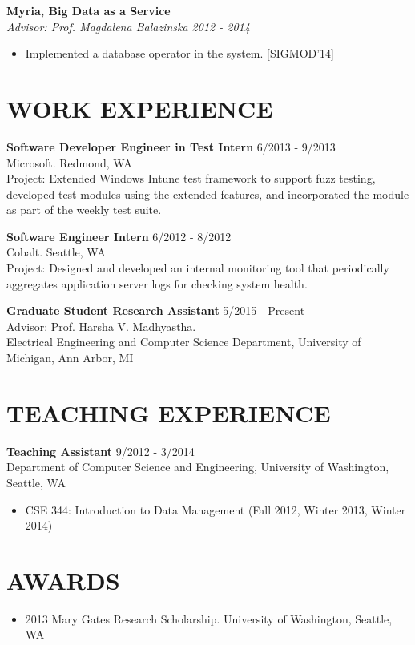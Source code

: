 \documentclass[zhemargin]{res}
\begin{document}
\begin{resume}
	\textbf{Myria, Big Data as a Service}\\
    \textit{Advisor: Prof. Magdalena Balazinska \hfill 2012 - 2014}
	\begin{itemize}
    \item Implemented a database operator in the system. [SIGMOD'14]
	\end{itemize}

\section{\small WORK EXPERIENCE}
    \textbf{Software Developer Engineer in Test Intern} \hfill 6/2013 - 9/2013 \\
    Microsoft. Redmond, WA\\
    Project: Extended Windows Intune test framework to support fuzz testing, developed test modules using the extended features, and incorporated the module as part of the weekly test suite.

    \textbf{Software Engineer Intern} \hfill 6/2012 - 8/2012 \\
    Cobalt. Seattle, WA\\
    Project: Designed and developed an internal monitoring tool that periodically aggregates application server logs for checking system health.

    \textbf{Graduate Student Research Assistant} \hfill 5/2015 - Present \\
    Advisor: Prof. Harsha V. Madhyastha.\\
    Electrical Engineering and Computer Science Department, University of Michigan, Ann Arbor, MI

\section{\small TEACHING EXPERIENCE}
	\textbf{Teaching Assistant} \hfill 9/2012 - 3/2014 \\
	Department of Computer Science and Engineering, University of Washington, Seattle, WA
	\begin{itemize}
      \item CSE 344: Introduction to Data Management (Fall 2012, Winter 2013, Winter 2014)
	\end{itemize}

\section{\small AWARDS}
	\begin{itemize}[leftmargin=*, topsep=-10pt] %
    \item 2013 Mary Gates Research Scholarship. University of Washington, Seattle, WA
	\end{itemize}


\end{resume}
\end{document}
